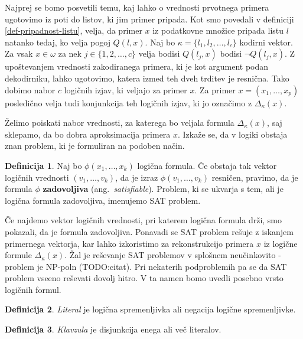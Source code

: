 \documentclass[12pt,a4paper,twoside]{article}
\theoremstyle{definition} %
\newtheorem{definicija}{Definicija}[section]
\theoremstyle{plain} %
\numberwithin{equation}{section}  %
\begin{document}
Najprej se bomo posvetili temu, kaj lahko o vrednosti prvotnega primera ugotovimo iz poti do listov, ki jim primer pripada.
Kot smo povedali v definiciji \ref{def-pripadnost-listu}, velja, da primer $x$ iz podatkovne množice pripada listu $l$ natanko tedaj, ko velja pogoj $Q(l,x)$.
Naj bo $\kappa=\{l_1, l_2, \ldots, l_c\}$ kodirni vektor.
Za vsak $x \in \omega$ za nek $j \in \{1,2,\ldots,c\}$ velja bodisi $Q(l_j,x)$ bodisi $\lnot Q(l_j,x)$.
Z upoštevanjem vrednosti zakodiranega primera, ki je kot argument podan dekodirniku, lahko ugotovimo, katera izmed teh dveh trditev je resnična.
Tako dobimo nabor $c$ logičnih izjav, ki veljajo za primer $x$.
Za primer $x=(x_1,\ldots,x_p)$ posledično velja tudi konjunkcija teh logičnih izjav, ki jo označimo z $\Delta_{\kappa}(x)$.

Želimo poiskati nabor vrednosti, za katerega bo veljala formula $\Delta_{\kappa}(x)$, saj sklepamo, da bo dobra aproksimacija primera $x$.
Izkaže se, da v logiki obstaja znan problem, ki je formuliran na podoben način.

\begin{definicija}
	Naj bo $\phi(x_1,\ldots,x_k)$ logična formula.
	Če obstaja tak vektor logičnih vrednosti $(v_1, \ldots, v_k)$, da je izraz $\phi(v_1, \ldots, v_k)$ resničen,
	pravimo, da je formula $\phi$ \textbf{zadovoljiva} (ang.~\textsl{satisfiable}).
	Problem, ki se ukvarja s tem, ali je logična formula zadovoljiva, imenujemo SAT problem. %
\end{definicija}
Če najdemo vektor logičnih vrednosti, pri katerem logična formula drži, smo pokazali, da je formula zadovoljiva.
Ponavadi se SAT problem rešuje z iskanjem primernega vektorja, kar lahko izkoristimo za rekonstrukcijo primera $x$ iz logične formule $\Delta_{\kappa}(x)$.
Žal je reševanje SAT problemov v splošnem neučinkovito - problem je NP-poln (TODO:citat).
Pri nekaterih podproblemih pa se da SAT problem vseeno reševati dovolj hitro. %
V ta namen bomo uvedli posebno vrsto logičnih formul.

\begin{definicija}
	\emph{Literal} je logična spremenljivka ali negacija logične spremenljivke.
\end{definicija}

\begin{definicija}
	\emph{Klavzula} je disjunkcija enega ali več literalov.
\end{definicija}
\end{document}

